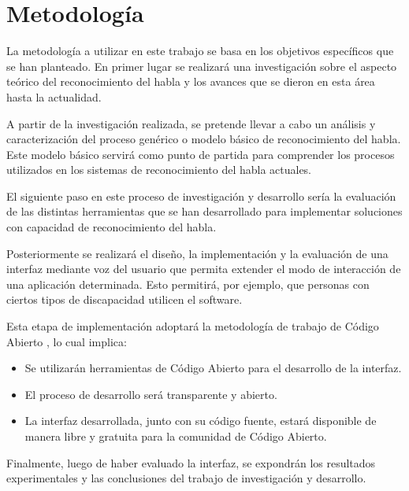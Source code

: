 \section{Metodolog\'{i}a}
\label{sec:metodologia}

La metodolog\'{i}a a utilizar en este trabajo se basa en los objetivos espec\'{i}ficos que se 
han planteado. En primer lugar se realizar\'{a} una investigaci\'{o}n sobre el aspecto te\'{o}rico 
del reconocimiento del habla y los avances que se dieron en esta \'{a}rea hasta la actualidad.

A partir de la investigaci\'{o}n realizada, se pretende llevar a cabo un an\'{a}lisis y 
caracterizaci\'{o}n del proceso gen\'{e}rico o modelo b\'{a}sico de reconocimiento del habla. 
Este modelo b\'{a}sico servir\'{a} como punto de partida para comprender los procesos utilizados en los sistemas de reconocimiento del habla actuales.

El siguiente paso en este proceso de investigaci\'{o}n y desarrollo ser\'{i}a la evaluaci\'{o}n de las 
distintas herramientas que se han desarrollado para implementar soluciones con 
capacidad de reconocimiento del habla.

Posteriormente se realizar\'{a} el dise\~{n}o, la implementaci\'{o}n y la evaluaci\'{o}n de una interfaz mediante
voz del usuario que permita extender el modo de interacci\'{o}n de una aplicaci\'{o}n determinada. Esto permitir\'{a}, por ejemplo, que personas con ciertos tipos de discapacidad utilicen el software. 

Esta etapa de implementaci\'{o}n adoptar\'{a} la metodolog\'{i}a de trabajo de C\'{o}digo
Abierto \cite{WikipediaOpenSource}, lo cual implica:  

\begin{itemize}
    \item Se utilizar\'{a}n herramientas de C\'{o}digo Abierto para el desarrollo de la interfaz. 

    \item El proceso de desarrollo ser\'{a} transparente y abierto. 
    
    \item La interfaz desarrollada, junto con su c\'{o}digo fuente, estar\'{a} disponible de manera libre 
    y gratuita para la comunidad de C\'{o}digo Abierto.
\end{itemize}

Finalmente, luego de haber evaluado la interfaz, se expondr\'{a}n los resultados experimentales y las 
conclusiones del trabajo de investigaci\'{o}n y desarrollo.
